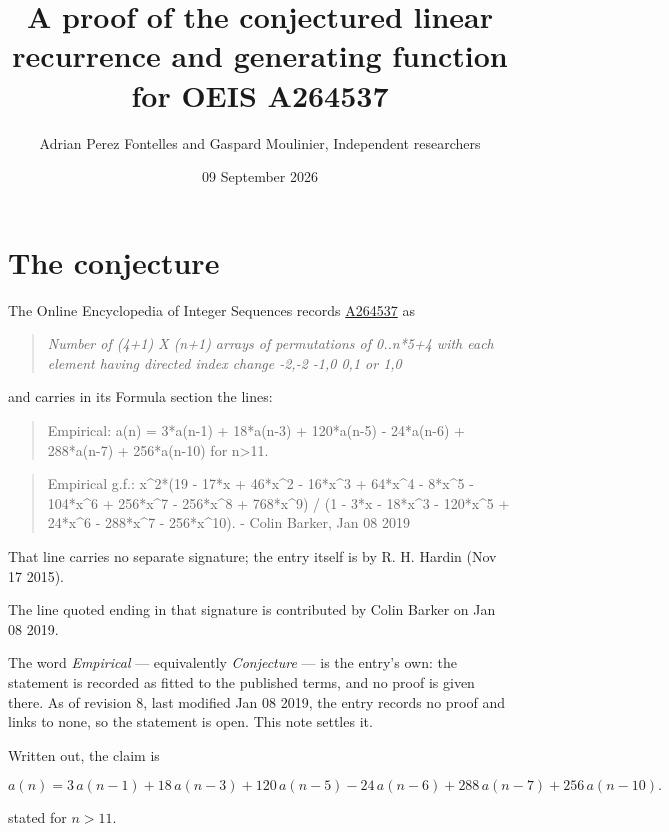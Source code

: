 \documentclass[11pt]{article}
\title{A proof of the conjectured linear recurrence and generating function for OEIS A264537}
\author{Adrian Perez Fontelles and Gaspard Moulinier, Independent researchers}
\date{09 September 2026}
\theoremstyle{definition}
\begin{document}
\maketitle
\section{The conjecture}

The Online Encyclopedia of Integer Sequences records \href{https://oeis.org/A264537}{A264537} as

\begin{quote}\itshape Number of (4+1) X (n+1) arrays of permutations of 0..n*5+4 with each element having directed index change -2,-2 -1,0 0,1 or 1,0\end{quote}

and carries in its Formula section the lines:

\begin{quote}\ttfamily Empirical: a(n) = 3*a(n-1) + 18*a(n-3) + 120*a(n-5) - 24*a(n-6) + 288*a(n-7) + 256*a(n-10) for n>11.\end{quote}

\begin{quote}\ttfamily Empirical g.f.: x\textasciicircum{}2*(19 - 17*x + 46*x\textasciicircum{}2 - 16*x\textasciicircum{}3 + 64*x\textasciicircum{}4 - 8*x\textasciicircum{}5 - 104*x\textasciicircum{}6 + 256*x\textasciicircum{}7 - 256*x\textasciicircum{}8 + 768*x\textasciicircum{}9) / (1 - 3*x - 18*x\textasciicircum{}3 - 120*x\textasciicircum{}5 + 24*x\textasciicircum{}6 - 288*x\textasciicircum{}7 - 256*x\textasciicircum{}10). - Colin Barker, Jan 08 2019\end{quote}

That line carries no separate signature; the entry itself is by R. H. Hardin (Nov 17 2015).

The line quoted ending in that signature is contributed by Colin Barker on Jan 08 2019.

The word {\itshape Empirical} --- equivalently {\itshape Conjecture} --- is the entry's own: the statement is recorded as fitted to the published terms, and no proof is given there. As of revision 8, last modified Jan 08 2019, the entry records no proof and links to none, so the statement is open. This note settles it.

Written out, the claim is

\[a(n) = 3\,a(n-1) + 18\,a(n-3) + 120\,a(n-5) - 24\,a(n-6) + 288\,a(n-7) + 256\,a(n-10).\]

stated for $n > 11$.
\end{document}
